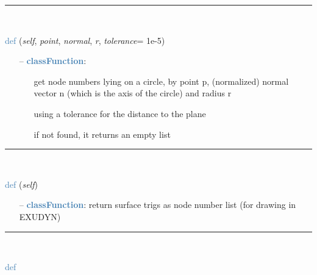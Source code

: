 \begin{itemize}[leftmargin=1.4cm]
\begin{itemize}[leftmargin=1.4cm]
\begin{itemize}[leftmargin=0.5cm]
\begin{itemize}[leftmargin=1.4cm]
\begin{itemize}[leftmargin=1.4cm]
\begin{itemize}[leftmargin=0.5cm]
\begin{itemize}[leftmargin=0.7cm]
\vspace{12pt}\end{itemize}
%
\noindent\rule{8cm}{0.75pt}\vspace{1pt} \\ 
\begin{flushleft}
\noindent \textcolor{steelblue}{def {\bf {}}}\label{sec:FEM:FEMinterface:GetNodesOnCircle}
({\it self}, {\it point}, {\it normal}, {\it r}, {\it tolerance}= 1e-5)
\end{flushleft}
\setlength{\itemindent}{0.7cm}
\begin{itemize}[leftmargin=0.7cm]
  \item[--]  \textcolor{steelblue}{\bf classFunction}: \vspace{-6pt}
  \begin{itemize}[leftmargin=1.2cm]
\setlength{\itemindent}{-0.7cm}
    \item[] get node numbers lying on a circle, by point p, (normalized) normal vector n (which is the axis of the circle) and radius r
    \item[] using a tolerance for the distance to the plane
    \item[] if not found, it returns an empty list
  \end{itemize}
\vspace{12pt}\end{itemize}
%
\noindent\rule{8cm}{0.75pt}\vspace{1pt} \\ 
\begin{flushleft}
\noindent \textcolor{steelblue}{def {\bf {}}}\label{sec:FEM:FEMinterface:GetSurfaceTriangles}
({\it self})
\end{flushleft}
\setlength{\itemindent}{0.7cm}
\begin{itemize}[leftmargin=0.7cm]
  \item[--]  \textcolor{steelblue}{\bf classFunction}: return surface trigs as node number list (for drawing in EXUDYN)\vspace{12pt}\end{itemize}
%
\noindent\rule{8cm}{0.75pt}\vspace{1pt} \\ 
\begin{flushleft}
\noindent \textcolor{steelblue}{def {\bf {}}}\label{sec:FEM:FEMinterface:VolumeToSurfaceElements}

\end{flushleft}
\end{itemize}
\end{itemize}
\end{itemize}
\end{itemize}
\end{itemize}
\end{itemize}
